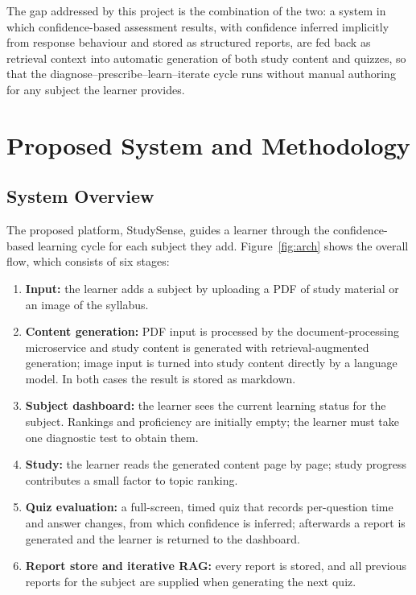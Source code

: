 \documentclass[12pt,a4paper,oneside]{report}
\begin{document}
The gap addressed by this project is the combination of the two: a system
in which confidence-based assessment results, with confidence inferred
implicitly from response behaviour and stored as structured reports,
are fed back as retrieval context into automatic generation of both study
content and quizzes, so that the diagnose--prescribe--learn--iterate cycle
runs without manual authoring for any subject the learner provides.

\chapter{Proposed System and Methodology}\label{ch:method}

\section{System Overview}

The proposed platform, StudySense, guides a learner through the confidence-based
learning cycle for each subject they add. Figure~\ref{fig:arch} shows the
overall flow, which consists of six stages:
\begin{enumerate}
  \item \textbf{Input:} the learner adds a subject by uploading a PDF of
        study material or an image of the syllabus.
  \item \textbf{Content generation:} PDF input is processed by the
        document-processing microservice and study content is generated
        with retrieval-augmented generation; image input is turned into
        study content directly by a language model. In both cases the
        result is stored as markdown.
  \item \textbf{Subject dashboard:} the learner sees the current learning
        status for the subject. Rankings and proficiency are initially
        empty; the learner must take one diagnostic test to obtain them.
  \item \textbf{Study:} the learner reads the generated content page by
        page; study progress contributes a small factor to topic ranking.
  \item \textbf{Quiz evaluation:} a full-screen, timed quiz that records
        per-question time and answer changes, from which confidence is
        inferred; afterwards a report is generated and the learner is returned to the dashboard.
  \item \textbf{Report store and iterative RAG:} every report is stored, and
        all previous reports for the subject are supplied when generating
        the next quiz.
\end{enumerate}
\end{document}

